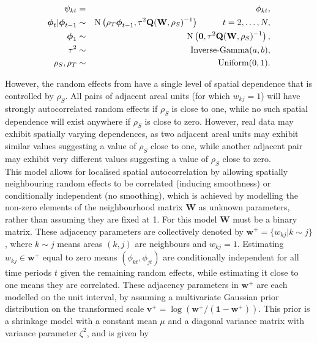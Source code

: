 \documentclass[article, nojss]{jss}
\newcommand{\bd}[1]{\ensuremath{\mbox{\boldmath $#1$}}}
\begin{document}
\begin{eqnarray}
\psi_{kt}&=&\phi_{kt},\label{caradaptive1}\\
\bd{\phi}_t|\bd{\phi}_{t-1} & \sim & \mbox{N}\left(\rho_T\bd{\phi}_{t-1}, \tau^{2} \mathbf{Q}(\mathbf{W},\rho_S)^{-1}\right)\hspace{1cm} t=2,\ldots,N,\nonumber\\
\bd{\phi}_1 & \sim & \mbox{N}\left(\mathbf{0}, \tau^{2} \mathbf{Q}(\mathbf{W},\rho_S)^{-1}\right),\nonumber\\
\tau^2&\sim&\mbox{Inverse-Gamma}(a,b),\nonumber\\
\rho_S,\rho_T&\sim&\mbox{Uniform}(0,1).\nonumber
\end{eqnarray}


However, the random effects from   have a single level of spatial dependence that is controlled by $\rho_S$. All pairs of adjacent areal units (for which $w_{kj}=1$) will have strongly autocorrelated random effects if $\rho_S$ is close to one, while no such spatial dependence will exist anywhere if $\rho_S$ is close to zero. However, real data may exhibit spatially varying dependences, as two adjacent areal units may exhibit similar values suggesting a value of $\rho_S$ close to one, while another adjacent pair may exhibit very different values suggesting a value of $\rho_S$ close to zero.\\

This model allows for localised spatial autocorrelation by allowing spatially neighbouring  random effects to be correlated (inducing smoothness) or conditionally independent (no smoothing), which is  achieved by modelling the non-zero elements of the neighbourhood matrix $\mathbf{W}$  as unknown parameters, rather than assuming they are fixed at 1. For this model $\mathbf{W}$ must be a binary matrix. These adjacency parameters are collectively denoted by $\mathbf{w}^{+}=\{w_{kj}|k\sim j\}$, where $k\sim j$ means areas $(k,j)$ are neighbours and $w_{kj}=1$. Estimating $w_{kj}\in\mathbf{w}^{+}$ equal to zero means $(\phi_{kt}, \phi_{jt})$  are conditionally independent for all time periods $t$  given the remaining random effects, while estimating it close to one means they are correlated. These adjacency parameters in $\mathbf{w}^{+}$ are each modelled on the unit interval, by assuming a multivariate Gaussian prior distribution on the transformed scale $\mathbf{v}^+ = \log\left(\mathbf{w}^{+}/(\mathbf{1} - \mathbf{w}^{+}) \right)$.  This prior is a shrinkage model with a constant mean $\mu$ and a diagonal variance matrix with variance parameter $\zeta^2$, and is given by
\end{document}
